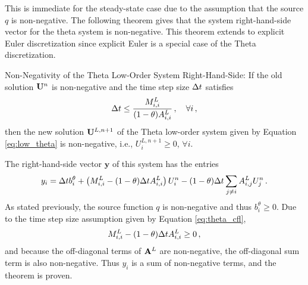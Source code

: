 
This is immediate for the steady-state case due to the assumption that the
source $q$ is non-negative. The following theorem gives that the system
right-hand-side vector for the theta system is non-negative. This theorem
extends to explicit Euler discretization since explicit Euler is a special case
of the Theta discretization.
\begin{thm}{Non-Negativity of the Theta Low-Order System Right-Hand-Side:}
  If the old solution $\mathbf{U}^n$ is non-negative and
  the time step size $\Delta t$ satisfies
\begin{equation}\label{eq:theta_cfl}
   \Delta t \leq \frac{M^L_{i,i}}{(1-\theta)A_{i,i}^L}
    \,,\quad\forall i \,,
\end{equation}
  then the new solution $\mathbf{U}^{L,n+1}$ of the Theta low-order
  system given by Equation \eqref{eq:low_theta} is non-negative, i.e.,
  $U^{L,n+1}_i \geq 0$, $\forall i$.
\end{thm}

\begin{prf}
The right-hand-side vector $\mathbf{y}$ of this system has the entries
\[
  y_i = \Delta t b^\theta_i + \left(M^L_{i,i} - (1-\theta)\Delta t A^L_{i,i}\right) U^n_i
      - (1-\theta)\Delta t\sum\limits_{j\ne i} A^L_{i,j} U^n_j
  \,.
\]
As stated previously, the source function $q$ is non-negative and 
thus $b^\theta_i \ge 0 $. Due to the time step size assumption
given by Equation \eqref{eq:theta_cfl},
\[
  M^L_{i,i} - (1-\theta)\Delta t A^L_{i,i} \geq 0 \,,
\]
and because the off-diagonal terms of $\mathbf{A}^L$ are non-negative, the off-diagonal
sum term is also non-negative. Thus $y_i$ is a sum of non-negative
terms, and the theorem is proven.
\end{prf}
